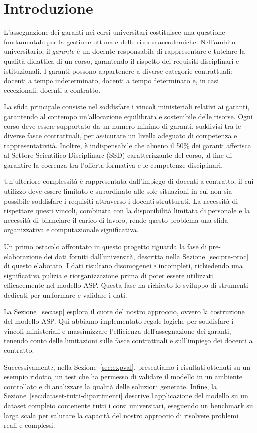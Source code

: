 \section{Introduzione}
\label{sec:introduction}

L'assegnazione dei garanti nei corsi universitari costituisce una 
questione fondamentale per la gestione ottimale delle risorse accademiche. 
Nell'ambito universitario, il \textit{garante} è un docente responsabile 
di rappresentare e tutelare la qualità didattica di un corso, garantendo 
il rispetto dei requisiti disciplinari e istituzionali. I garanti possono 
appartenere a diverse categorie contrattuali: docenti a tempo indeterminato, 
docenti a tempo determinato e, in casi eccezionali, docenti a contratto.

La sfida principale consiste nel soddisfare i vincoli ministeriali 
relativi ai garanti, garantendo al contempo un'allocazione equilibrata 
e sostenibile delle risorse. Ogni corso deve essere supportato da un 
numero minimo di garanti, suddivisi tra le diverse fasce contrattuali, 
per assicurare un livello adeguato di competenza e rappresentatività. 
Inoltre, è indispensabile che almeno il 50\% dei garanti afferisca al 
Settore Scientifico Disciplinare (SSD) caratterizzante del corso, al 
fine di garantire la coerenza tra l'offerta formativa e le competenze 
disciplinari.

Un'ulteriore complessità è rappresentata dall'impiego di docenti a 
contratto, il cui utilizzo deve essere limitato e subordinato alle 
sole situazioni in cui non sia possibile soddisfare i requisiti 
attraverso i docenti strutturati. La necessità di rispettare questi 
vincoli, combinata con la disponibilità limitata di personale e la 
necessità di bilanciare il carico di lavoro, rende questo problema 
una sfida organizzativa e computazionale significativa.

Un primo ostacolo affrontato in questo progetto riguarda la fase di 
pre-elaborazione dei dati forniti dall'università, descritta nella 
Sezione~\ref{sec:pre-proc} di questo elaborato. I dati risultano 
disomogenei e incompleti, richiedendo una significativa pulizia e 
riorganizzazione prima di poter essere utilizzati efficacemente nel 
modello ASP. Questa fase ha richiesto lo sviluppo di strumenti 
dedicati per uniformare e validare i dati.

La Sezione~\ref{sec:asp} esplora il cuore del nostro approccio, 
ovvero la costruzione del modello ASP. Qui abbiamo implementato 
regole logiche per soddisfare i vincoli ministeriali e massimizzare 
l'efficienza dell'assegnazione dei garanti, tenendo conto delle 
limitazioni sulle fasce contrattuali e sull'impiego dei docenti a contratto.

Successivamente, nella Sezione~\ref{sec:expval}, presentiamo 
i risultati ottenuti su un esempio ridotto, un test che ha permesso 
di validare il modello in un ambiente controllato e di analizzare la qualità 
delle soluzioni generate. Infine, la Sezione~\ref{sec:dataset-tutti-dipartimenti} descrive 
l'applicazione del modello su un dataset completo contenente tutti i corsi 
universitari, eseguendo un benchmark su larga scala per valutare la 
capacità del nostro approccio di risolvere problemi reali e complessi.